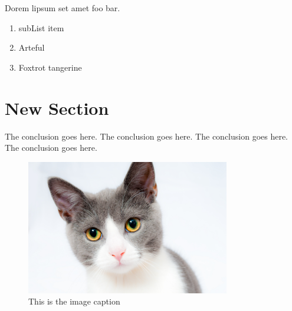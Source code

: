 \documentclass[10pt,conference,compsocconf]{IEEEtran}
\begin{document}
Dorem lipsum set amet foo bar.

\begin{enumerate}
\item subList item
\item Arteful
\item Foxtrot tangerine
\end{enumerate}

\section{New Section}
\label{newsection}

The conclusion goes here. The conclusion goes here. The conclusion goes here.
The conclusion goes here.

\begin{figure}[htbp]
\centering
\includegraphics[width=3.5in]{img/test1_cat.jpg}
\caption{This is the image caption}
\label{image_label}
\end{figure}



\end{document}

